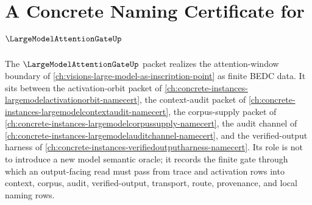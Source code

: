 \chapter{A Concrete Naming Certificate for $\LargeModelAttentionGateUp$}
\label{ch:concrete-instances-largemodelattentiongate-namecert}

The $\LargeModelAttentionGateUp$ packet realizes the attention-window boundary of \autoref{ch:visions-large-model-as-inscription-point} as finite BEDC data. It sits between the activation-orbit packet of \autoref{ch:concrete-instances-largemodelactivationorbit-namecert}, the context-audit packet of \autoref{ch:concrete-instances-largemodelcontextaudit-namecert}, the corpus-supply packet of \autoref{ch:concrete-instances-largemodelcorpussupply-namecert}, the audit channel of \autoref{ch:concrete-instances-largemodelauditchannel-namecert}, and the verified-output harness of \autoref{ch:concrete-instances-verifiedoutputharness-namecert}. Its role is not to introduce a new model semantic oracle; it records the finite gate through which an output-facing read must pass from trace and activation rows into context, corpus, audit, verified-output, transport, route, provenance, and local naming rows.

